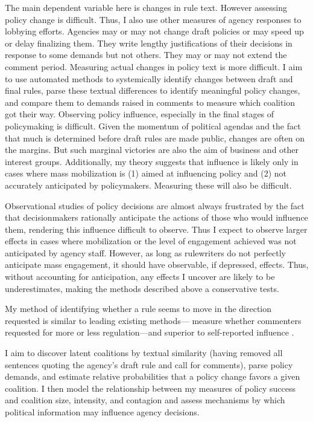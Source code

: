 

The main dependent variable here is changes in rule text. However assessing policy change is difficult. Thus, I also use other measures of agency responses to lobbying efforts. 
Agencies may or may not change draft policies or may speed up or delay finalizing them. They write lengthy justifications of their decisions in response to some demands but not others. They may or may not extend the comment period. Measuring actual changes in policy text is more difficult. I aim to use automated methods to systemically identify changes between draft and final rules, parse these textual differences to identify meaningful policy changes, and compare them to demands raised in comments to measure which coalition got their way.
Observing policy influence, especially in the final stages of policymaking is difficult. Given the momentum of political agendas and the fact that much is determined before draft rules are made public, changes are often on the margins. But such marginal victories are also the aim of business and other interest groups. 
Additionally, my theory suggests that influence is likely only in cases where mass mobilization is (1) aimed at influencing policy and (2) not accurately anticipated by policymakers. Measuring these will also be difficult.



Observational studies of policy decisions are almost always frustrated by the fact that decisionmakers rationally anticipate the actions of those who would influence them, rendering this influence difficult to observe. Thus I expect to observe larger effects in cases where mobilization or the level of engagement achieved was not anticipated by agency staff. However, as long as rulewriters do not perfectly anticipate mass engagement, it should have observable, if depressed, effects. Thus, without accounting for anticipation, any effects I uncover are likely to be underestimates, making the methods described above a conservative tests.

My method of identifying whether a rule seems to move in the direction requested is similar to leading existing methods---\citet{Yackee2006JOP} measure whether commenters requested for more or less regulation---and superior to self-reported influence \citep{Furlong1997}.

I aim to discover latent coalitions by textual similarity (having removed all sentences quoting the agency's draft rule and call for comments), parse policy demands, and estimate relative probabilities that a policy change favors a given coalition. I then model the relationship between my measures of policy success and coalition size, intensity, and contagion and assess mechanisms
by which political information may influence agency decisions.

